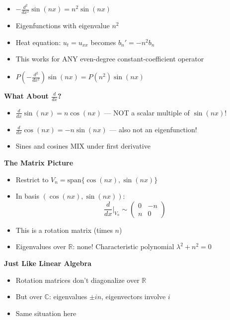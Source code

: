 \documentclass[
  10pt,
  letterpaper,
]{scrbook}
\providecommand{\tightlist}{%
  \setlength{\itemsep}{0pt}\setlength{\parskip}{0pt}}
\begin{document}
\begin{itemize}
\tightlist
\item
  \(-\frac{d^2}{dx^2}\sin(nx) = n^2\sin(nx)\)
\item
  Eigenfunctions with eigenvalue \(n^2\)
\item
  Heat equation: \(u_t = u_{xx}\) becomes \(b_n' = -n^2 b_n\)
\item
  This works for ANY even-degree constant-coefficient operator
\item
  \(P\left(-\frac{d^2}{dx^2}\right)\sin(nx) = P(n^2)\sin(nx)\)
\end{itemize}

\textbf{What About \(\frac{d}{dx}\)?}

\begin{itemize}
\tightlist
\item
  \(\frac{d}{dx}\sin(nx) = n\cos(nx)\) --- NOT a scalar multiple of
  \(\sin(nx)\)!
\item
  \(\frac{d}{dx}\cos(nx) = -n\sin(nx)\) --- also not an eigenfunction!
\item
  Sines and cosines MIX under first derivative
\end{itemize}

\textbf{The Matrix Picture}

\begin{itemize}
\tightlist
\item
  Restrict to \(V_n = \text{span}\{\cos(nx), \sin(nx)\}\)
\item
  In basis \((\cos(nx), \sin(nx))\):
  \[\frac{d}{dx}\Big|_{V_n} \sim \begin{pmatrix} 0 & -n \\ n & 0 \end{pmatrix}\]
\item
  This is a rotation matrix (times \(n\))
\item
  Eigenvalues over \(\mathbb{R}\): none! Characteristic polynomial
  \(\lambda^2 + n^2 = 0\)
\end{itemize}

\textbf{Just Like Linear Algebra}

\begin{itemize}
\tightlist
\item
  Rotation matrices don't diagonalize over \(\mathbb{R}\)
\item
  But over \(\mathbb{C}\): eigenvalues \(\pm in\), eigenvectors involve
  \(i\)
\item
  Same situation here
\end{itemize}
\end{document}
